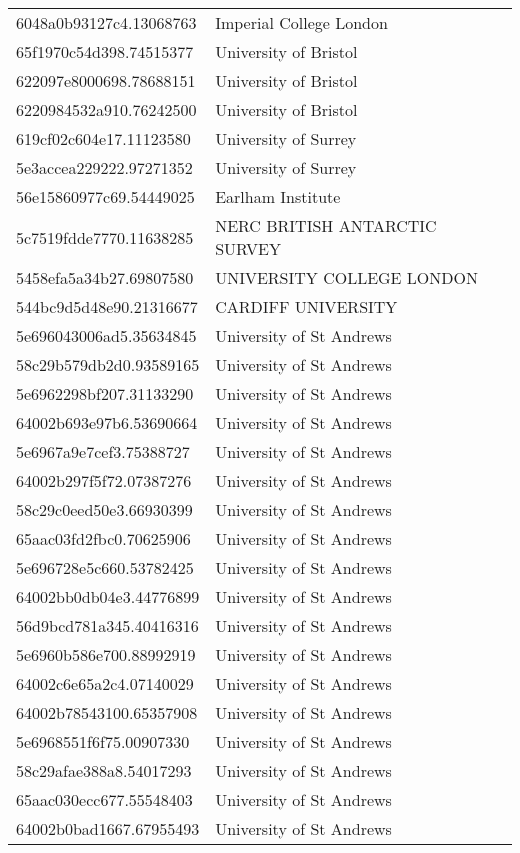 \begin{tabular}{ll}
6048a0b93127c4.13068763 & Imperial College London \\
65f1970c54d398.74515377 & University of Bristol \\
622097e8000698.78688151 & University of Bristol \\
6220984532a910.76242500 & University of Bristol \\
619cf02c604e17.11123580 & University of Surrey \\
5e3accea229222.97271352 & University of Surrey \\
56e15860977c69.54449025 & Earlham Institute \\
5c7519fdde7770.11638285 & NERC BRITISH ANTARCTIC SURVEY \\
5458efa5a34b27.69807580 & UNIVERSITY COLLEGE LONDON \\
544bc9d5d48e90.21316677 & CARDIFF UNIVERSITY \\
5e696043006ad5.35634845 & University of St Andrews \\
58c29b579db2d0.93589165 & University of St Andrews \\
5e6962298bf207.31133290 & University of St Andrews \\
64002b693e97b6.53690664 & University of St Andrews \\
5e6967a9e7cef3.75388727 & University of St Andrews \\
64002b297f5f72.07387276 & University of St Andrews \\
58c29c0eed50e3.66930399 & University of St Andrews \\
65aac03fd2fbc0.70625906 & University of St Andrews \\
5e696728e5c660.53782425 & University of St Andrews \\
64002bb0db04e3.44776899 & University of St Andrews \\
56d9bcd781a345.40416316 & University of St Andrews \\
5e6960b586e700.88992919 & University of St Andrews \\
64002c6e65a2c4.07140029 & University of St Andrews \\
64002b78543100.65357908 & University of St Andrews \\
5e6968551f6f75.00907330 & University of St Andrews \\
58c29afae388a8.54017293 & University of St Andrews \\
65aac030ecc677.55548403 & University of St Andrews \\
64002b0bad1667.67955493 & University of St Andrews \\

\end{tabular}
